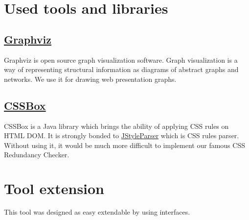 \documentclass[12pt,a4paper]{article}
\begin{document}
\section {Used tools and libraries}
\subsection{\href{http://graphviz.org/}{Graphviz}}
Graphviz is open source graph visualization software. Graph visualization is a way of representing structural information as diagrams of abstract graphs and networks. We use it for drawing web presentation graphs.
\subsection{\href{http://cssbox.sourceforge.net/}{CSSBox}}
CSSBox is a Java library which brings the ability of applying CSS rules on HTML DOM. It is strongly bonded to \href{http://cssbox.sourceforge.net/jstyleparser/}{JStyleParser} which is CSS rules parser. Without using it, it would be much more difficult to implement our famous CSS Redundancy Checker.

\section{Tool extension}
This tool was designed as easy extendable by using interfaces.
\end{document}
